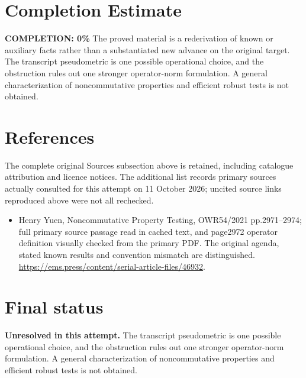 \documentclass[11pt]{article}
\begin{document}
\section{Completion Estimate}
\noindent\textbf{COMPLETION: 0\%}
The proved material is a rederivation of known or auxiliary facts rather than a substantiated new advance on the original target. The transcript pseudometric is one possible operational choice, and the obstruction rules out one stronger operator-norm formulation. A general characterization of noncommutative properties and efficient robust tests is not obtained.
\section{References}
The complete original Sources subsection above is retained, including catalogue attribution and licence notices. The additional list records primary sources actually consulted for this attempt on 11 October 2026; uncited source links reproduced above were not all rechecked.
\begin{itemize}
\item Henry Yuen, Noncommutative Property Testing, OWR54/2021 pp.2971–2974; full primary source passage read in cached text, and page2972 operator definition visually checked from the primary PDF. The original agenda, stated known results and convention mismatch are distinguished. \url{https://ems.press/content/serial-article-files/46932}.
\end{itemize}
\section{Final status}
\textbf{Unresolved in this attempt.} The transcript pseudometric is one possible operational choice, and the obstruction rules out one stronger operator-norm formulation. A general characterization of noncommutative properties and efficient robust tests is not obtained.
\end{document}
